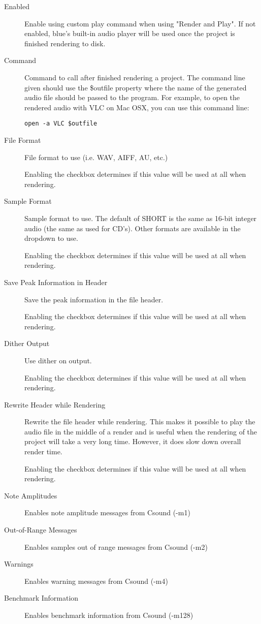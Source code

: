 \begin{description}
\item[Enabled]
Enable using custom play command when using "Render and Play". If not
enabled, blue's built-in audio player will be used once the project is
finished rendering to disk.
\item[Command]
Command to call after finished rendering a project. The command line
given should use the \$outfile property where the name of the generated
audio file should be passed to the program. For example, to open the
rendered audio with VLC on Mac OSX, you can use this command line:

\begin{verbatim}
open -a VLC $outfile
\end{verbatim}
\end{description}

\begin{description}
\item[File Format]
File format to use (i.e. WAV, AIFF, AU, etc.)

Enabling the checkbox determines if this value will be used at all when
rendering.
\item[Sample Format]
Sample format to use. The default of SHORT is the same as 16-bit integer
audio (the same as used for CD's). Other formats are available in the
dropdown to use.

Enabling the checkbox determines if this value will be used at all when
rendering.
\item[Save Peak Information in Header]
Save the peak information in the file header.

Enabling the checkbox determines if this value will be used at all when
rendering.
\item[Dither Output]
Use dither on output.

Enabling the checkbox determines if this value will be used at all when
rendering.
\item[Rewrite Header while Rendering]
Rewrite the file header while rendering. This makes it possible to play
the audio file in the middle of a render and is useful when the
rendering of the project will take a very long time. However, it does
slow down overall render time.

Enabling the checkbox determines if this value will be used at all when
rendering.
\end{description}

\begin{description}
\item[Note Amplitudes]
Enables note amplitude messages from Csound (-m1)
\item[Out-of-Range Messages]
Enables samples out of range messages from Csound (-m2)
\item[Warnings]
Enables warning messages from Csound (-m4)
\item[Benchmark Information]
Enables benchmark information from Csound (-m128)
\end{description}

